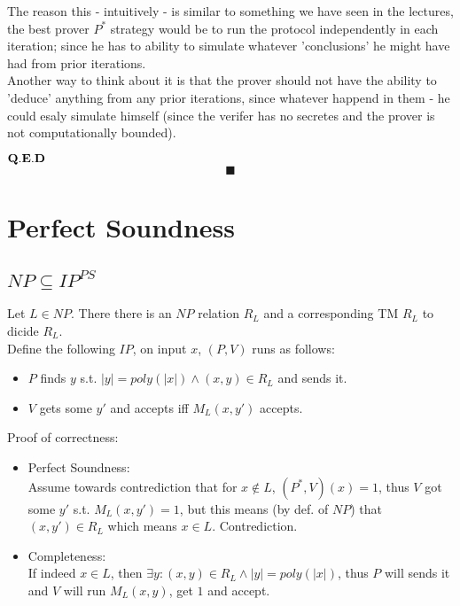 \documentclass{article}
\begin{document}
The reason this - intuitively - is similar to something we have seen in
the lectures, the best prover $P^*$ strategy would be to run the protocol independently
in each iteration; since he has to ability to simulate whatever 'conclusions' he
might have had from prior iterations.\\
Another way to think about it is that the prover
should not have the ability to 'deduce' anything from any prior iterations,
since whatever happend in them - he could esaly simulate himself
(since the verifer has no secretes and the prover is not computationally bounded).

$\bold{Q.E.D}$
\[\blacksquare\]

\section{Perfect Soundness}
\subsection{$NP\subseteq IP^{PS}$}
Let $L\in NP$. There there is an $NP$ relation $R_L$ and
a corresponding TM $R_L$ to dicide $R_L$.\\

Define the following $IP$, on input $x$, $(P,V)$ runs as follows:
\begin{itemize}
    \item $P$ finds $y$ s.t. $|y|=poly(|x|)\wedge (x,y)\in R_L$ and sends it.
    \item $V$ gets some $y'$ and accepts iff $M_L(x,y')$ accepts.
\end{itemize}
Proof of correctness:
\begin{itemize}
    \item Perfect Soundness:\\
    Assume towards contrediction that for $x\notin L$, $(P^*,V)(x)=1$,
    thus $V$ got some $y'$ s.t. $M_L(x,y')=1$, but this means (by def. of $NP$)
    that $(x,y')\in R_L$ which means $x\in L$. Contrediction.
    \item Completeness:\\
    If indeed $x\in L$, then $\exists y:(x,y)\in R_L\wedge |y|=poly(|x|)$,
    thus $P$ will sends it and $V$ will run $M_L(x,y)$, get $1$ and accept.
\end{itemize}
\end{document}
